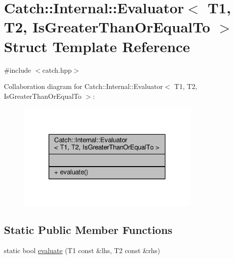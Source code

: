 \hypertarget{struct_catch_1_1_internal_1_1_evaluator_3_01_t1_00_01_t2_00_01_is_greater_than_or_equal_to_01_4}{\section{Catch\-:\-:Internal\-:\-:Evaluator$<$ T1, T2, Is\-Greater\-Than\-Or\-Equal\-To $>$ Struct Template Reference}
\label{struct_catch_1_1_internal_1_1_evaluator_3_01_t1_00_01_t2_00_01_is_greater_than_or_equal_to_01_4}
}


{\ttfamily \#include $<$catch.\-hpp$>$}



Collaboration diagram for Catch\-:\-:Internal\-:\-:Evaluator$<$ T1, T2, Is\-Greater\-Than\-Or\-Equal\-To $>$\-:
\nopagebreak
\begin{figure}[H]
\begin{center}
\leavevmode
\includegraphics[width=256pt]{struct_catch_1_1_internal_1_1_evaluator_3_01_t1_00_01_t2_00_01_is_greater_than_or_equal_to_01_4__coll__graph}
\end{center}
\end{figure}
\subsection*{Static Public Member Functions}
\begin{DoxyCompactItemize}
\item 
static bool \hyperlink{struct_catch_1_1_internal_1_1_evaluator_3_01_t1_00_01_t2_00_01_is_greater_than_or_equal_to_01_4_a5ba107c6da4292b6492a0e5e906f9484}{evaluate} (T1 const \&lhs, T2 const \&rhs)
\end{DoxyCompactItemize}


